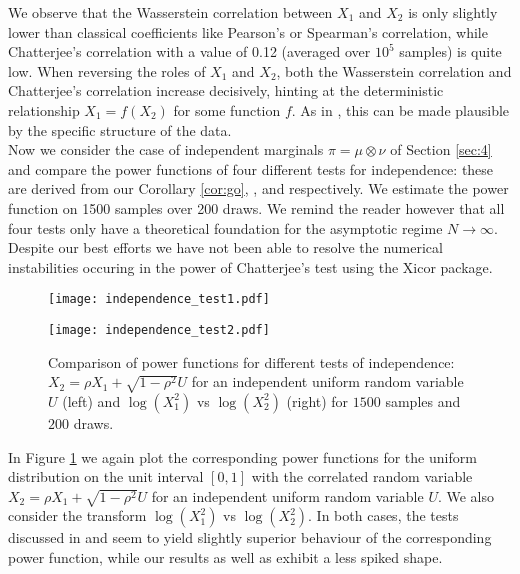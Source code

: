 \documentclass[10pt]{amsart}
\begin{document}
We observe that the Wasserstein correlation between $X_1$ and $X_2$ is only slightly lower than classical coefficients like Pearson's or Spearman's correlation, while Chatterjee's correlation with a value of 0.12 (averaged over $10^5$ samples) is quite low. When reversing the roles of $X_1$ and $X_2$, both the Wasserstein correlation and Chatterjee's correlation increase decisively, hinting at the deterministic relationship $X_1=f(X_2)$ for some function $f$. As in \cite{chatterjee2020new}, this can be made plausible by the specific structure of the data.\\

Now we consider the case of independent marginals $\pi=\mu\otimes \nu$ of Section \ref{sec:4} and compare the power functions of four different tests for independence: these are derived from our Corollary \ref{cor:go}, \cite[Theorem 2.1]{chatterjee2020new}, \cite[Theorem 6]{szekely2007measuring} and \cite[Theorem 3.1]{shi2020distribution} respectively. We estimate the power function on 1500 samples over 200 draws. We remind the reader however that all four tests only have a theoretical foundation for the asymptotic regime $N\to \infty$. Despite our best efforts we have not been able to resolve the numerical instabilities occuring in the power of Chatterjee's test using the Xicor package.

\begin{figure}[h!]
\begin{center}
\begin{minipage}{0.48\textwidth}
\texttt{[image: independence\_test1.pdf]}
\end{minipage}
\quad
\begin{minipage}{0.48\textwidth}
\texttt{[image: independence\_test2.pdf]}
\end{minipage}
\caption{Comparison of power functions for different tests of independence: $X_2=\rho X_1 +\sqrt{1-\rho^2} U$ for an independent uniform random variable $U$ (left) and  $\log(X^2_1)$ vs $\log(X_2^2)$ (right) for $1500$ samples and $200$ draws.}\label{fig:5}
\end{center}
\end{figure}
In Figure \ref{fig:5} we again plot the corresponding power functions for the uniform distribution on the unit interval $[0,1]$ with the correlated random variable $X_2=\rho X_1 +\sqrt{1-\rho^2} U$ for an independent uniform random variable $U$. We also consider the transform $\log(X^2_1)$ vs $\log(X_2^2)$.
In both cases, the tests discussed in \cite[Theorem 6]{szekely2007measuring} and \cite[Theorem 3.1]{shi2020distribution} seem to yield slightly superior behaviour of the corresponding power function, while our results as well as \cite[Theorem 2.1]{chatterjee2020new} exhibit a less spiked shape.
\end{document}
